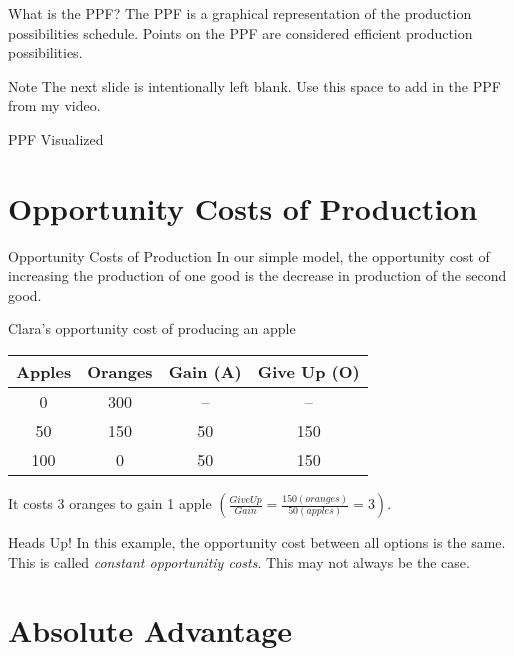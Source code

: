 \documentclass{beamer}
\begin{document}
\begin{frame}{What is the PPF?}
The PPF is a graphical representation of the production possibilities schedule. Points on the PPF are considered efficient production possibilities. 

\begin{alertblock}{Note}
The next slide is intentionally left blank. Use this space to add in the PPF from my video.
\end{alertblock}

\end{frame}

\begin{frame}{PPF Visualized}

\end{frame}

\section{Opportunity Costs of Production}

\begin{frame}{Opportunity Costs of Production}
In our simple model, the opportunity cost of increasing the production of one good is the decrease in production of the second good. 

\begin{block}{Clara's opportunity cost of producing an apple}
\begin{tabular}{ c  c  | c c }\hline
Apples & Oranges & Gain (A) & Give Up (O) \\\hline
0 & 300 &  -- & --   \\
50 & 150 & 50  & 150  \\
100 & 0 & 50 & 150 \\\hline
\end{tabular}
\end{block}

It costs 3 oranges to gain 1 apple $\left(\frac{GiveUp}{Gain} = \frac{150 (oranges)}{50 (apples)} = 3 \right)$. 


\begin{alertblock}{Heads Up!}
In this example, the opportunity cost between all options is the same. This is called \textit{constant opportunitiy costs}. This may not always be the case.
\end{alertblock}


\end{frame}

\section{Absolute Advantage}
\end{document}

